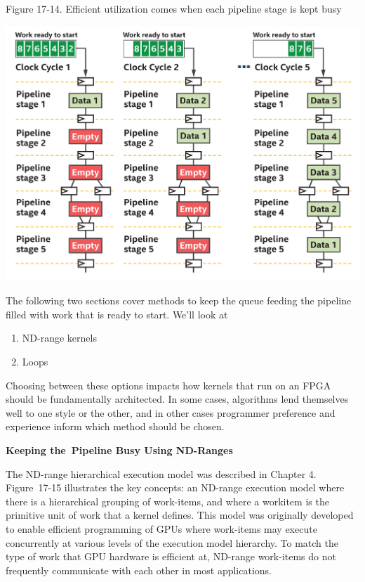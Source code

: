 \hspace*{\fill} \par %
Figure 17-14. Efficient utilization comes when each pipeline stage is kept busy
\begin{center}
	\includegraphics[width=1.0\textwidth]{content/chapter-17/images/13}
\end{center}

The following two sections cover methods to keep the queue feeding the pipeline filled with work that is ready to start. We’ll look at\par

\begin{enumerate}
	\item ND-range kernels
	\item Loops
\end{enumerate}

Choosing between these options impacts how kernels that run on an FPGA should be fundamentally architected. In some cases, algorithms lend themselves well to one style or the other, and in other cases programmer preference and experience inform which method should be chosen.\par

\hspace*{\fill} \par %
\textbf{Keeping the Pipeline Busy Using ND-Ranges}

The ND-range hierarchical execution model was described in Chapter 4. Figure 17-15 illustrates the key concepts: an ND-range execution model where there is a hierarchical grouping of work-items, and where a workitem is the primitive unit of work that a kernel defines. This model was originally developed to enable efficient programming of GPUs where work-items may execute concurrently at various levels of the execution model hierarchy. To match the type of work that GPU hardware is efficient at, ND-range work-items do not frequently communicate with each other in most applications.\par

